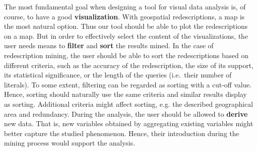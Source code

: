 The most fundamental goal when designing a tool for visual data
analysis is, of course, to have a good \textbf{visualization}. With
geospatial redescriptions, a map is the most natural option. Thus our
tool should be able to plot the redescriptions on a map. But in order
to effectively select the content of the visualizations, the user
needs means to \textbf{filter} and \textbf{sort} the results mined. In
the case of redescription mining, the user should be able to sort the
redescriptions based on different criteria, such as the accuracy of
the redescription, the size of its support, its statistical
significance, or the length of the queries (i.e.\ their number of
literals).  To some extent, filtering can be regarded as sorting with
a cut-off value. Hence, sorting should naturally use the same criteria
and similar results display as sorting. Additional criteria might
affect sorting, e.g. the described geographical area and
redundancy. During the analysis, the user should be allowed to
\textbf{derive} new data. That is, new variables obtained by
aggregating existing variables might better capture the studied
phenomenon. Hence, their introduction during the mining process would
support the analysis.

